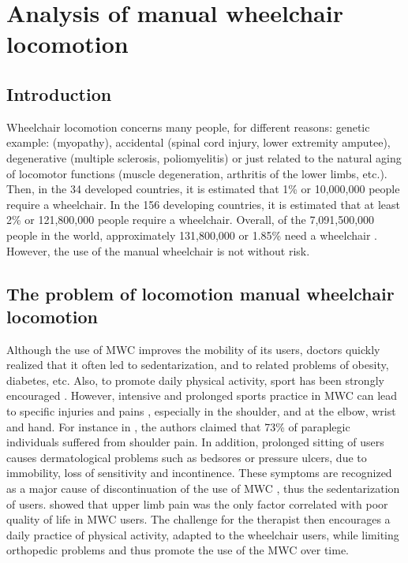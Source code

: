 \chapter[Wheelchair locomotion]{Analysis of manual wheelchair locomotion}
\label{locomotion_analysis}

\section{Introduction}
Wheelchair locomotion concerns many people, for different reasons: genetic example: (myopathy), accidental (spinal cord injury, lower extremity amputee), degenerative (multiple sclerosis, poliomyelitis) or just related to the natural aging of locomotor functions (muscle degeneration, arthritis of the lower limbs, etc.). Then, in the 34 developed countries, it is estimated that 1\% or 10,000,000 people require a wheelchair. In the 156 developing countries, it is estimated that at least 2\% or 121,800,000 people require a wheelchair. Overall, of the 7,091,500,000 people in the world, approximately 131,800,000 or 1.85\% need a wheelchair \cite{Needs2016}. However, the use of the manual wheelchair is not without risk.

\section[Problem]{The problem of locomotion manual wheelchair locomotion}

Although the use of MWC improves the mobility of its users, doctors quickly realized that it often led to sedentarization, and to related problems of obesity, diabetes, etc. Also, to promote daily physical activity, sport has been strongly encouraged \cite{machida2013resilience}. However, intensive and prolonged sports practice in MWC can lead to specific injuries and pains \cite{johnson2004sport}, especially in the shoulder, and at the elbow, wrist and hand. For instance in \cite{pentland1991weight}, the  authors claimed that 73\%  of paraplegic individuals suffered from shoulder pain. In addition, prolonged sitting of   users causes dermatological problems such as bedsores or pressure ulcers, due to immobility, loss of sensitivity and incontinence. These symptoms are recognized as a major cause of discontinuation of the use of MWC \cite{van2006manual}  \cite{ville2006work}, thus the sedentarization of users.  \cite{lundqvist1991spinal} showed that upper limb pain was the only factor correlated with poor quality of life in MWC users. The challenge for the therapist then encourages a daily practice of physical activity, adapted to the wheelchair users, while limiting orthopedic problems and thus promote the use of the MWC over time.


